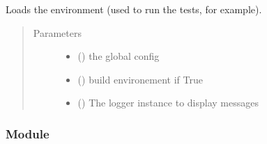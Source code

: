 \documentclass[a4paper,10pt,english]{sphinxmanual}
\begin{document}
\begin{fulllineitems}
\label{\detokenize{commands/apidoc/src:src.environment.load_environment}}
Loads the environment (used to run the tests, for example).
\begin{quote}\begin{description}
\item[{Parameters}] \leavevmode\begin{itemize}
\item {} 
 () \textendash{} the global config

\item {} 
 () \textendash{} build environement if True

\item {} 
 () \textendash{} The logger instance to display messages

\end{itemize}

\end{description}\end{quote}

\end{fulllineitems}



\subsubsection{ Module}
\label{\detokenize{commands/apidoc/src:fileenviron-module}}\label{\detokenize{commands/apidoc/src:module-src.fileEnviron}}
\end{document}
